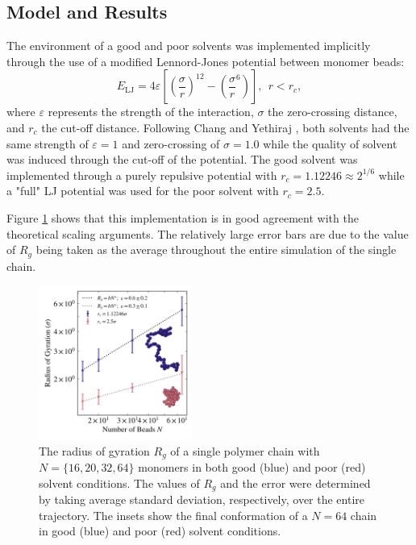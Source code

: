 \documentclass[10pt,a4paper]{labreport}
\begin{document}
\subsection{Model and Results}
The environment of a good and poor solvents was implemented implicitly through the use of a modified Lennord-Jones potential between monomer beads:
\begin{equation}
  E_\text{LJ} = 4 \varepsilon \left[\left(\frac{\sigma}{r}\right)^{12} - \left(\frac{\sigma}{r}^{6}\right)\right], ~~ r < r_c,
\end{equation}
where $\varepsilon$ represents the strength of the interaction, $\sigma$ the zero-crossing distance, and $r_c$ the cut-off distance. 
Following Chang and Yethiraj \cite{Chang_LJ}, both solvents had the same strength of $\varepsilon = 1$ and zero-crossing of $\sigma = 1.0$ while the quality of solvent was induced through the cut-off of the potential. 
The good solvent was implemented through a purely repulsive potential with $r_c = 1.12246 \approx 2 ^{1/6}$ while a "full" LJ potential was used for the poor solvent with $r_c =  2.5$. 

Figure \ref{fig:ass2_rgs} shows that this implementation is in good agreement with the theoretical scaling arguments. The relatively large error bars are due to the value of $R_g$ being taken as the average throughout the entire simulation of the single chain. 
\begin{figure}[h]
  \centering  
  \includegraphics[width = 0.45\textwidth]{figs/ass2_rgs.png}
  \caption{The radius of gyration $R_g$ of a single polymer chain with $N = \{16, 20, 32, 64\}$ monomers in both good (blue) and poor (red) solvent conditions. The values of $R_g$ and the error were determined by taking average standard deviation, respectively, over the entire trajectory. The insets show the final conformation of a $N=64$ chain in good (blue) and poor (red) solvent conditions. }
  \label{fig:ass2_rgs}
\end{figure}
\end{document}
